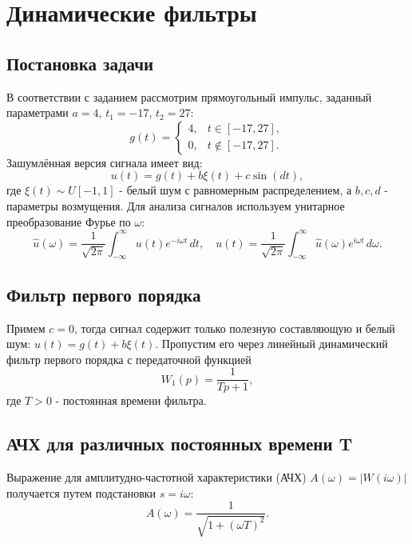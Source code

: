 \section{Динамические фильтры}

\subsection{Постановка задачи}
В соответствии с заданием рассмотрим прямоугольный импульс, заданный параметрами $a = 4$, $t_1 = -17$, $t_2 = 27$:
\begin{equation*}
    g(t) =
    \begin{cases}
        4, & t \in [-17, 27],    \\
        0, & t \notin [-17, 27].
    \end{cases}
    \label{eq:gt}
\end{equation*}
Зашумлённая версия сигнала имеет вид:
\begin{equation*}
    u(t) = g(t) + b\xi(t) + c\sin(dt),
    \label{eq:ut}
\end{equation*}
где $\xi(t) \sim U[-1, 1]$ - белый шум с равномерным распределением, а $b, c, d$ - параметры возмущения. Для анализа сигналов используем унитарное преобразование Фурье по $\omega$:
\begin{equation*}
    \hat{u}(\omega) = \frac{1}{\sqrt{2\pi}} \int_{-\infty}^{\infty} u(t) e^{-i\omega t} \, dt, \quad
    u(t) = \frac{1}{\sqrt{2\pi}} \int_{-\infty}^{\infty} \hat{u}(\omega) e^{i\omega t} \, d\omega.
    \label{eq:ft}
\end{equation*}

\subsection{Фильтр первого порядка}
Примем $c = 0$, тогда сигнал содержит только полезную составляющую и белый шум: $u(t) = g(t) + b\xi(t)$. Пропустим его через линейный динамический фильтр первого порядка с передаточной функцией
\begin{equation*}
    W_1(p) = \frac{1}{Tp + 1},
    \label{eq:w1}
\end{equation*}
где $T > 0$ - постоянная времени фильтра.\\

\subsection{АЧХ для различных постоянных времени T}

Выражение для амплитудно-частотной характеристики (АЧХ) $A(\omega) = |W(i\omega)|$ получается путем подстановки $s = i\omega$:
\begin{equation*}
    A(\omega) = \frac{1}{\sqrt{1 + (\omega T)^2}}.
    \label{eq:ach_formula}
\end{equation*}

